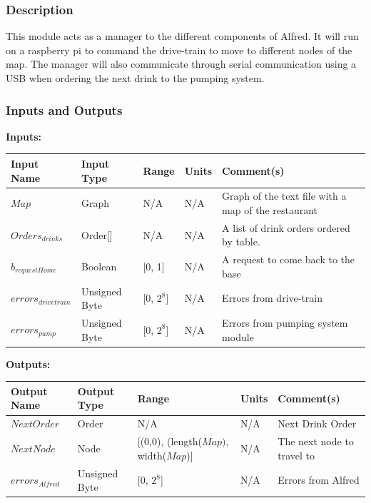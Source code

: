 \documentclass [10pt]{article}
\begin{document}
\subsubsection{Description}
This module acts as a manager to the different components of Alfred. It will run on a raspberry pi to command the drive-train to move to different nodes of the map. The manager will also communicate through serial communication using a USB when ordering the next drink to the pumping system.


\subsubsection{Inputs and Outputs}


\textbf{Inputs: } \\

\begin{longtable}{|l|l|l|l|l|}\hline 
	\rowcolor{tableCell}\textbf{Input Name} & \textbf{Input Type} & \textbf{Range} & \textbf{Units} & \textbf{Comment(s)} \\ \hline
	$ Map $ & Graph & N/A & N/A & Graph of the text file with a map of the restaurant \\ \hline
	\rowcolor{tableCell}$ Orders_{drinks} $ & Order[] & N/A & N/A & A list of drink orders ordered by table. \\ \hline
	$ b_{requestHome} $ & Boolean & [0, 1]& N/A &  A request to come back to the base\\ \hline
	\rowcolor{tableCell}$ errors_{drivetrain} $ & Unsigned Byte & [0, $2^{8}$]& N/A & Errors from drive-train \\ \hline
	$  errors_{pump} $ & Unsigned Byte & [0, $2^{8}$]& N/A & Errors from pumping system module \\ \hline
\end{longtable}


\textbf{Outputs: } \\

\begin{longtable}{|l|l|l|l|l|}\hline 
	\rowcolor{tableCell}\textbf{Output Name} & \textbf{Output Type} & \textbf{Range} & \textbf{Units} & \textbf{Comment(s)} \\ \hline
	$ NextOrder $ & Order & N/A & N/A & Next Drink Order \\ \hline
	\rowcolor{tableCell}$ NextNode $ & Node & [(0,0), (length($Map)$, width($Map$)] & N/A & The next node to travel to \\ \hline
	$  errors_{Alfred} $ & Unsigned Byte & [0, $2^{8}$]& N/A & Errors from Alfred \\ \hline
\end{longtable}
\end{document}
